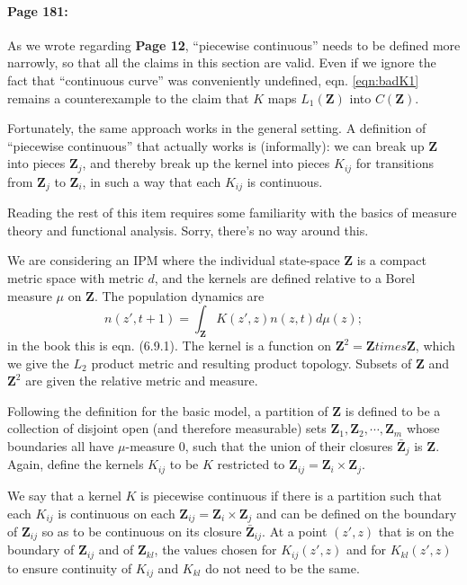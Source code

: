 \documentclass[12pt]{article}
\numberwithin{Box}{section}
\def\Z{\mathbf{Z}}
\newcommand{\be}{\begin{equation}}
\newcommand{\ee}{\end{equation}}
\begin{document}
\paragraph{Page 181:} As we wrote regarding \textbf{Page 12}, ``piecewise continuous'' needs 
to be defined more narrowly, so that all the claims in this section are valid. 
Even if we ignore the fact that ``continuous curve'' was conveniently undefined, 
eqn. \eqref{eqn:badK1} remains a counterexample to the claim that $K$ maps $L_1(\Z)$ into $C(\Z)$. 

Fortunately, the same approach works in the general setting. A definition of ``piecewise continuous''
that actually works is (informally): we can break up $\Z$ into pieces $\Z_j$, and thereby break up the kernel into
pieces $K_{ij}$ for transitions from $\Z_j$ to $\Z_i$, in such a way that each $K_{ij}$ is continuous. 

Reading the rest of this item requires some familiarity with the basics of measure theory 
and functional analysis. Sorry, there's no way around this. 

We are considering an IPM where the individual state-space $\Z$ is a compact metric space with metric $d$, 
and the kernels are defined relative to a Borel measure $\mu$ on $\Z$. 
The population dynamics are 
\be
n(z',t+1) = \int_{\Z} K(z',z)n(z,t) d\mu(z);
\ee 
in the book this is eqn. (6.9.1). The kernel is a function on $\Z^2 = \Z times \Z$, which we give the
$L_2$ product metric and resulting product topology. Subsets of $\Z$ and $\Z^2$ are given the relative
metric and measure. 

Following the definition for the basic model, a partition of $\Z$ is defined to be a collection of disjoint 
open (and therefore measurable) sets $\Z_1, \Z_2, \cdots, \Z_m $ whose boundaries all have $\mu$-measure 0, 
such that the union of their closures $\bar{\Z}_j$ is $\Z$. Again, define the kernels $K_{ij}$ to be $K$ 
restricted to $\Z_{ij} = \Z_i \times \Z_j$. 

We say that a kernel $K$ is piecewise continuous if there is a partition such that each $K_{ij}$ is 
continuous on each $\Z_{ij} = \Z_i \times \Z_j$ and can be defined on the boundary 
of $\Z_{ij}$ so as to be continuous on its closure $\bar{\Z}_{ij}$. At a point $(z',z)$ that is on the boundary
of $\Z_{ij}$ and of $\Z_{kl}$, the values chosen for $K_{ij}(z',z)$ and for $K_{kl}(z',z)$ to ensure continuity
of $K_{ij}$ and $K_{kl}$ do not need to be the same.  
\end{document}
